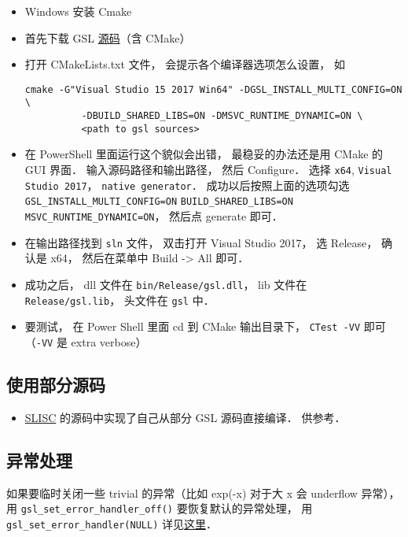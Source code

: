 \begin{itemize}
\item Windows 安装 Cmake
\item 首先下载 GSL \href{https://github.com/ampl/gsl}{源码}（含 CMake）
\item 打开 CMakeLists.txt 文件， 会提示各个编译器选项怎么设置， 如
\begin{lstlisting}[language=none]
    cmake -G"Visual Studio 15 2017 Win64" -DGSL_INSTALL_MULTI_CONFIG=ON \
          -DBUILD_SHARED_LIBS=ON -DMSVC_RUNTIME_DYNAMIC=ON \
          <path to gsl sources>
\end{lstlisting}
\item 在 PowerShell 里面运行这个貌似会出错， 最稳妥的办法还是用 CMake 的 GUI 界面． 输入源码路径和输出路径， 然后 Configure． 选择 \verb`x64`, \verb`Visual Studio 2017`， \verb`native generator`． 成功以后按照上面的选项勾选 \verb`GSL_INSTALL_MULTI_CONFIG=ON` \verb`BUILD_SHARED_LIBS=ON` \verb`MSVC_RUNTIME_DYNAMIC=ON`， 然后点 generate 即可．
\item 在输出路径找到 \verb`sln` 文件， 双击打开 Visual Studio 2017， 选 Release， 确认是 x64， 然后在菜单中 Build -> All 即可．

\item 成功之后， dll 文件在 \verb`bin/Release/gsl.dll`， lib 文件在 \verb`Release/gsl.lib`， 头文件在 \verb`gsl` 中．
\item 要测试， 在 Power Shell 里面 cd 到 CMake 输出目录下， \verb`CTest -VV` 即可 （\verb`-VV` 是 extra verbose）
\end{itemize}

\subsection{使用部分源码}
\begin{itemize}
\item \href{https://github.com/MacroUniverse/SLISC}{SLISC} 的源码中实现了自己从部分 GSL 源码直接编译． 供参考．
\end{itemize}

\subsection{异常处理}
如果要临时关闭一些 trivial 的异常（比如 exp(-x) 对于大 x 会 underflow 异常）， 用 \verb|gsl_set_error_handler_off()|
要恢复默认的异常处理， 用 \verb|gsl_set_error_handler(NULL)|
详见\href{https://www.gnu.org/software/gsl/doc/html/err.html}{这里}．
